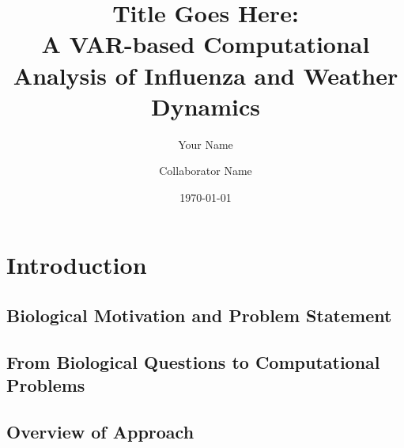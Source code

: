 \documentclass[11pt]{article}
\title{Title Goes Here:\\
  A VAR-based Computational Analysis of Influenza and Weather Dynamics}
\author{Your Name \and Collaborator Name}
\date{\today}
\begin{document}
\onehalfspacing   %

\maketitle

\begin{abstract}
\end{abstract}

\tableofcontents
\newpage

\section{Introduction}

\subsection{Biological Motivation and Problem Statement}

\subsection{From Biological Questions to Computational Problems}

\subsection{Overview of Approach}
\end{document}
